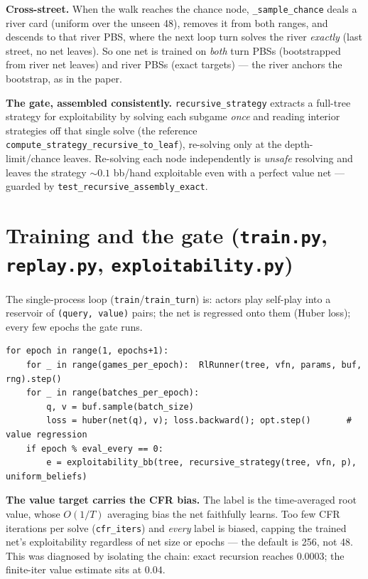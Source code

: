 \documentclass[11pt,a4paper]{article}
\newcommand{\file}[1]{\textcolor{accent}{\texttt{#1}}}
\newcommand{\fn}[1]{\texttt{#1}}
\begin{document}
\textbf{Cross-street.} When the walk reaches the chance node, \fn{\_sample\_chance}
deals a river card (uniform over the unseen 48), removes it from both ranges, and
descends to that river PBS, where the next loop turn solves the river
\emph{exactly} (last street, no net leaves). So one net is trained on
\emph{both} turn PBSs (bootstrapped from river net leaves) and river PBSs (exact
targets) --- the river anchors the bootstrap, as in the paper.

\textbf{The gate, assembled consistently.} \fn{recursive\_strategy} extracts a
full-tree strategy for exploitability by solving each subgame \emph{once} and
reading interior strategies off that single solve (the reference
\texttt{compute\_strategy\_recursive\_to\_leaf}), re-solving only at the
depth-limit/chance leaves. Re-solving each node independently is \emph{unsafe}
resolving and leaves the strategy $\sim 0.1$ bb/hand exploitable even with a
perfect value net --- guarded by \fn{test\_recursive\_assembly\_exact}.

\section{Training and the gate (\file{train.py}, \file{replay.py}, \file{exploitability.py})}

The single-process loop (\fn{train}/\fn{train\_turn}) is: actors play self-play
into a reservoir of \texttt{(query, value)} pairs; the net is regressed onto them
(Huber loss); every few epochs the gate runs.

\begin{lstlisting}[style=py, caption={\file{train.py} --- the loop and its gate. The gate measures the exploitability of the \emph{recursively-resolved} strategy in the exact ground-truth tree; it must fall toward the exact-solve floor as the net learns.}]
for epoch in range(1, epochs+1):
    for _ in range(games_per_epoch):  RlRunner(tree, vfn, params, buf, rng).step()
    for _ in range(batches_per_epoch):
        q, v = buf.sample(batch_size)
        loss = huber(net(q), v); loss.backward(); opt.step()       # value regression
    if epoch % eval_every == 0:
        e = exploitability_bb(tree, recursive_strategy(tree, vfn, p), uniform_beliefs)
\end{lstlisting}

\begin{trap}
\textbf{The value target carries the CFR bias.} The label is the time-averaged
root value, whose $O(1/T)$ averaging bias the net faithfully learns. Too few
CFR iterations per solve (\texttt{cfr\_iters}) and \emph{every} label is biased,
capping the trained net's exploitability regardless of net size or epochs ---
the default is 256, not 48. This was diagnosed by isolating the chain: exact
recursion reaches $0.0003$; the finite-iter value estimate sits at $0.04$.
\end{trap}
\end{document}
